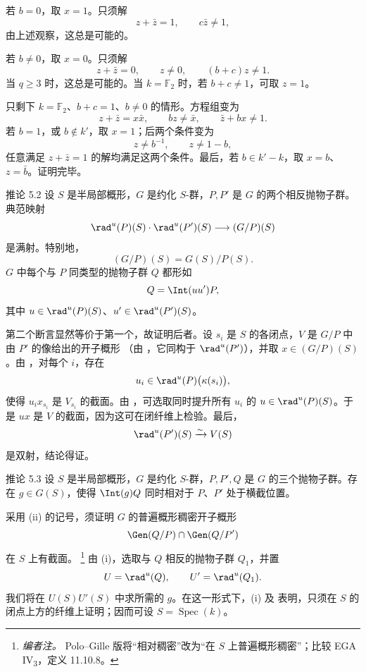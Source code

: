 若 \(b=0\)，取 \(x=1\)。只须解
\[
 z+\bar z=1,\qquad c\bar z\ne1,
\]
由上述观察，这总是可能的。

若 \(b\ne0\)，取 \(x=0\)。只须解
\[
 z+\bar z=0,\qquad z\ne0,\qquad (b+c)z\ne1.
\]
当 \(q\geq3\) 时，这总是可能的。当 \(k=\mathbb F_2\) 时，若 \(b+c\ne1\)，可取 \(z=1\)。

只剩下 \(k=\mathbb F_2\)、\(b+c=1\)、\(b\ne0\) 的情形。方程组变为
\[
 z+\bar z=x\bar x,\qquad bz\ne\bar x,\qquad
 \bar z+bx\ne1.
\]
若 \(b=1\)，或 \(b\notin k'\)，取 \(x=1\)；后两个条件变为
\[
 z\ne b^{-1},\qquad z\ne1-b,
\]
任意满足 \(z+\bar z=1\) 的解均满足这两个条件。最后，若 \(b\in k'-k\)，取 \(x=b\)、\(z=\bar b\)。证明完毕。
\SGAQED


\begin{sgastatement}{推论 5.2}
设 \(S\) 是半局部概形，\(G\) 是约化 \(S\)-群，\(P,P'\) 是 \(G\) 的两个相反抛物子群。典范映射
\[
 \rad^u(P)(S)\cdot\rad^u(P')(S)\longrightarrow(G/P)(S)
\]
是满射。特别地，
\[
 (G/P)(S)=G(S)/P(S).
\]
\(G\) 中每个与 \(P\) 同类型的抛物子群 \(Q\) 都形如
\[
 Q=\Int(uu')P,
\]
其中 \(u\in\rad^u(P)(S)\)、\(u'\in\rad^u(P')(S)\)。
\end{sgastatement}

第二个断言显然等价于第一个，故证明后者。设 \(s_i\) 是 \(S\) 的各闭点，\(V\) 是 \(G/P\) 中由 \(P'\) 的像给出的开子概形 \textup{（由 ，它同构于 \(\rad^u(P')\)）}，并取 \(x\in(G/P)(S)\)。由 ，对每个 \(i\)，存在
\[
 u_i\in\rad^u(P)\bigl(\kappa(s_i)\bigr),
\]
使得 \(u_ix_{s_i}\) 是 \(V_{s_i}\) 的截面。由 ，可选取同时提升所有 \(u_i\) 的 \(u\in\rad^u(P)(S)\)。于是 \(ux\) 是 \(V\) 的截面，因为这可在闭纤维上检验。最后，
\[
 \rad^u(P')(S)\xrightarrow{\sim}V(S)
\]
是双射，结论得证。

\begin{sgastatement}{推论 5.3}
设 \(S\) 是半局部概形，\(G\) 是约化 \(S\)-群，\(P,P',Q\) 是 \(G\) 的三个抛物子群。存在 \(g\in G(S)\)，使得 \(\Int(g)Q\) 同时相对于 \(P\)、\(P'\) 处于横截位置。
\end{sgastatement}

采用 \textup{(ii)} 的记号，须证明 \(G\) 的普遍概形稠密开子概形
\[
 \Gen(Q/P)\cap\Gen(Q/P')
\]
在 \(S\) 上有截面。
\footnote{\emph{编者注。} Polo--Gille 版将“相对稠密”改为“在 \(S\) 上普遍概形稠密”；比较 EGA IV\textsubscript{3}，定义 11.10.8。}
由 \textup{(i)}，选取与 \(Q\) 相反的抛物子群 \(Q_1\)，并置
\[
 U=\rad^u(Q),\qquad U'=\rad^u(Q_1).
\]
我们将在 \(U(S)U'(S)\) 中求所需的 \(g\)。在这一形式下，\textup{(i)} 及  表明，只须在 \(S\) 的闭点上方的纤维上证明；因而可设 \(S=\operatorname{Spec}(k)\)。


